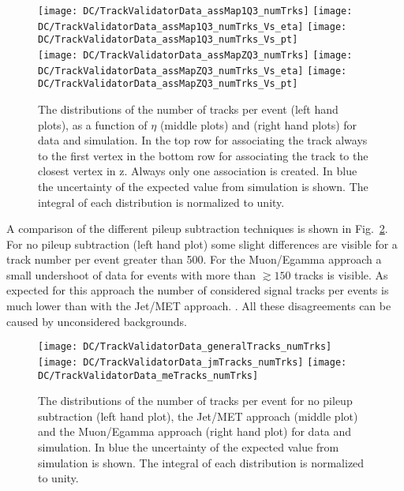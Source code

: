 \begin{figure}[h!t]
  \centering
  \texttt{[image: DC/TrackValidatorData\_assMap1Q3\_numTrks]}
  \texttt{[image: DC/TrackValidatorData\_assMap1Q3\_numTrks\_Vs\_eta]}
  \texttt{[image: DC/TrackValidatorData\_assMap1Q3\_numTrks\_Vs\_pt]}
  \\
  \texttt{[image: DC/TrackValidatorData\_assMapZQ3\_numTrks]}
  \texttt{[image: DC/TrackValidatorData\_assMapZQ3\_numTrks\_Vs\_eta]}
  \texttt{[image: DC/TrackValidatorData\_assMapZQ3\_numTrks\_Vs\_pt]}
  \caption[Track number and distributions for data and simulation for two options of the association map]{The distributions of the number of tracks per event (left hand plots), as a function of $\eta$ (middle plots) and \pt (right hand plots) for data and simulation. In the top row for associating the track always to the first vertex in the bottom row for associating the track to the closest vertex in z. Always only one association is created. In blue the uncertainty of the expected value from simulation is shown. The integral of each distribution is normalized to unity. \label{plot:DCTVTDQual}}
\end{figure}

A comparison of the different pileup subtraction techniques is shown in Fig.~\ref{plot:DCTVTDPUS}. For no pileup subtraction (left hand plot) some slight differences are visible for a track number per event greater than 500. For the Muon/Egamma approach a small undershoot of data for events with more than $\gtrsim150$ tracks is visible. As expected for this approach the number of considered signal tracks per events is much lower than with the Jet/MET approach. . All these disagreements can be caused by unconsidered backgrounds.

\begin{figure}[h!t]
  \centering
  \texttt{[image: DC/TrackValidatorData\_generalTracks\_numTrks]}
  \texttt{[image: DC/TrackValidatorData\_jmTracks\_numTrks]}
  \texttt{[image: DC/TrackValidatorData\_meTracks\_numTrks]}
  \caption[Track number for data and simulation for the different pileup subtraction techniques]{The distributions of the number of tracks per event for no pileup subtraction (left hand plot), the Jet/MET approach (middle plot) and the Muon/Egamma approach (right hand plot) for data and simulation. In blue the uncertainty of the expected value from simulation is shown. The integral of each distribution is normalized to unity. \label{plot:DCTVTDPUS}}
\end{figure}

